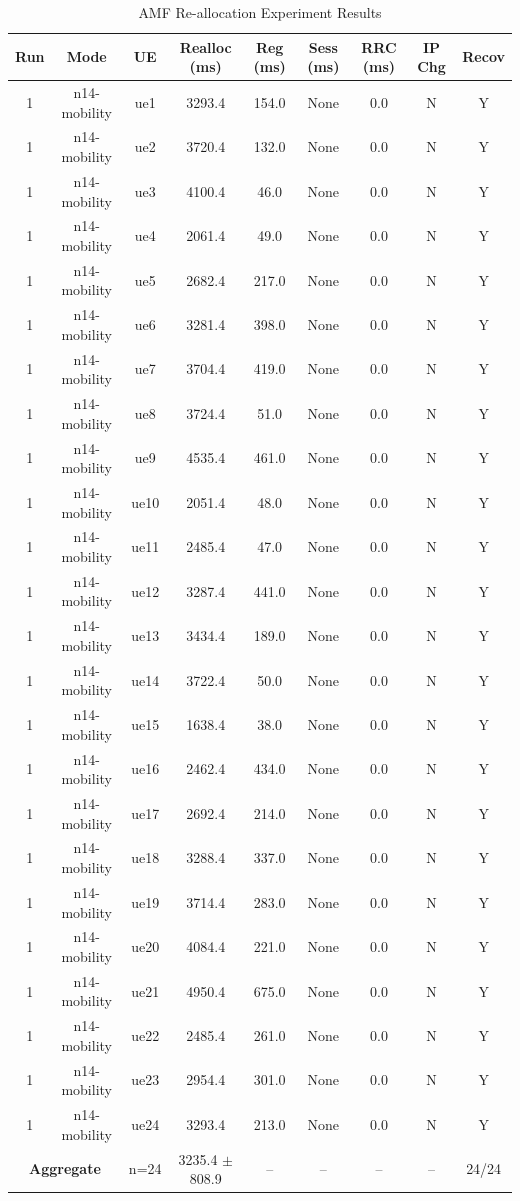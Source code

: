 \begin{table}[ht]
\centering
\begin{tabular}{|c|c|c|c|c|c|c|c|c|}
\hline
Run & Mode & UE & Realloc (ms) & Reg (ms) & Sess (ms) & RRC (ms) & IP Chg & Recov \\
\hline
1 & n14-mobility & ue1 & 3293.4 & 154.0 & None & 0.0 & N & Y \\
1 & n14-mobility & ue2 & 3720.4 & 132.0 & None & 0.0 & N & Y \\
1 & n14-mobility & ue3 & 4100.4 & 46.0 & None & 0.0 & N & Y \\
1 & n14-mobility & ue4 & 2061.4 & 49.0 & None & 0.0 & N & Y \\
1 & n14-mobility & ue5 & 2682.4 & 217.0 & None & 0.0 & N & Y \\
1 & n14-mobility & ue6 & 3281.4 & 398.0 & None & 0.0 & N & Y \\
1 & n14-mobility & ue7 & 3704.4 & 419.0 & None & 0.0 & N & Y \\
1 & n14-mobility & ue8 & 3724.4 & 51.0 & None & 0.0 & N & Y \\
1 & n14-mobility & ue9 & 4535.4 & 461.0 & None & 0.0 & N & Y \\
1 & n14-mobility & ue10 & 2051.4 & 48.0 & None & 0.0 & N & Y \\
1 & n14-mobility & ue11 & 2485.4 & 47.0 & None & 0.0 & N & Y \\
1 & n14-mobility & ue12 & 3287.4 & 441.0 & None & 0.0 & N & Y \\
1 & n14-mobility & ue13 & 3434.4 & 189.0 & None & 0.0 & N & Y \\
1 & n14-mobility & ue14 & 3722.4 & 50.0 & None & 0.0 & N & Y \\
1 & n14-mobility & ue15 & 1638.4 & 38.0 & None & 0.0 & N & Y \\
1 & n14-mobility & ue16 & 2462.4 & 434.0 & None & 0.0 & N & Y \\
1 & n14-mobility & ue17 & 2692.4 & 214.0 & None & 0.0 & N & Y \\
1 & n14-mobility & ue18 & 3288.4 & 337.0 & None & 0.0 & N & Y \\
1 & n14-mobility & ue19 & 3714.4 & 283.0 & None & 0.0 & N & Y \\
1 & n14-mobility & ue20 & 4084.4 & 221.0 & None & 0.0 & N & Y \\
1 & n14-mobility & ue21 & 4950.4 & 675.0 & None & 0.0 & N & Y \\
1 & n14-mobility & ue22 & 2485.4 & 261.0 & None & 0.0 & N & Y \\
1 & n14-mobility & ue23 & 2954.4 & 301.0 & None & 0.0 & N & Y \\
1 & n14-mobility & ue24 & 3293.4 & 213.0 & None & 0.0 & N & Y \\
\multicolumn{2}{|c|}{\textbf{Aggregate}} & n=24 & 3235.4 $\pm$ 808.9 & -- & -- & -- & -- & 24/24 \\
\hline
\end{tabular}
\caption{AMF Re-allocation Experiment Results}
\label{tab:amf_realloc}
\end{table}
